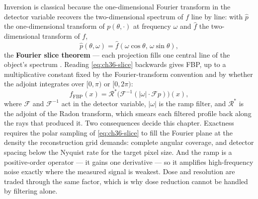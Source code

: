 Inversion is classical because the one-dimensional Fourier transform in the
detector variable recovers the two-dimensional spectrum of $f$ line by line:
with $\hat p$ the one-dimensional
transform of $p(\theta,\cdot)$ at frequency $\omega$ and $\hat f$ the
two-dimensional transform of $f$,
\begin{equation}
  \label{eq:ch36-slice}
  \hat{p}(\theta,\omega) = \hat{f}(\omega\cos\theta,\,\omega\sin\theta),
\end{equation}
the \textbf{Fourier slice theorem} --- each
projection fills one central line of the object's spectrum
\cite{kak2001tomographic,natterer2001mathematics}. Reading
\eqref{eq:ch36-slice} backwards gives FBP, up to a multiplicative constant fixed
by the Fourier-transform convention and by whether the adjoint integrates over
$[0,\pi)$ or $[0,2\pi)$:
\begin{equation}
  \label{eq:ch36-fbp}
  f_{\text{FBP}}(x) = \mathcal{R}^* \big( \mathcal{F}^{-1} (|\omega| \cdot \mathcal{F} p) \big)(x),
\end{equation}
where $\mathcal{F}$ and $\mathcal{F}^{-1}$ act in the detector variable,
$|\omega|$ is the ramp filter, and $\mathcal{R}^*$ is the adjoint of the Radon
transform, which smears each filtered profile back along the rays that produced
it. Two consequences decide this chapter. Exactness requires the polar sampling
of \eqref{eq:ch36-slice} to fill the Fourier plane at the density the
reconstruction grid demands: complete angular coverage, and detector spacing
below the Nyquist rate for
the target pixel size. And the ramp is a positive-order operator --- it gains
one derivative --- so it amplifies high-frequency noise exactly where the
measured signal is weakest. Dose and resolution are traded through the same
factor, which is why dose reduction cannot be handled by filtering alone.

